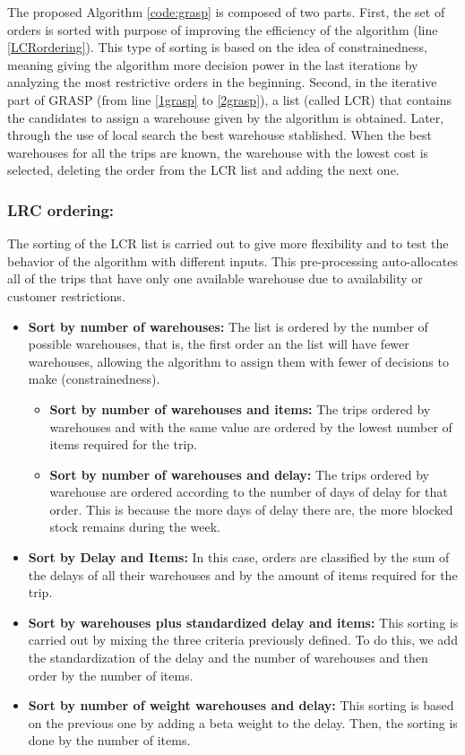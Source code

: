 \documentclass[letterpaper]{article} %
\begin{document}
The proposed Algorithm \ref{code:grasp} is composed of two parts. First, the set of orders is sorted with purpose of improving the efficiency of the algorithm (line \ref{LCRordering}). This type of sorting is based on the idea of constrainedness, meaning giving the algorithm more decision power in the last iterations by analyzing the most restrictive orders in the beginning. Second, in the iterative part of GRASP (from line \ref{1grasp} to \ref{2grasp}), a list (called LCR) that contains the candidates to assign a warehouse given by the algorithm is obtained. Later, through the use of local search the best warehouse stablished. When the best warehouses for all the trips are known, the warehouse with the lowest cost is selected, deleting the order from the LCR list and adding the next one.

\subsubsection*{LRC ordering:}
The sorting of the LCR list is carried out to give more flexibility and to test the behavior of the algorithm with different inputs. This pre-processing auto-allocates all of the trips that have only one available warehouse due to availability or customer restrictions.



\begin{itemize}
    \item \textbf{Sort by number of warehouses:} The list is ordered by the number of possible warehouses, that is, the first order an the list will have fewer warehouses, allowing the algorithm to assign them with fewer of decisions to make (constrainedness).
    \begin{itemize}
        \item \textbf{Sort by number of warehouses and items:} The trips ordered by warehouses and with the same value are ordered by the lowest number of items required for the trip.
        \item \textbf{Sort by number of warehouses and delay:} The trips ordered by warehouse are ordered according to the number of days of delay for that order. This is because the more days of delay there are, the more blocked stock remains during the week.
    \end{itemize}
    \item \textbf{Sort by Delay and Items:} In this case, orders are classified by the sum of the delays of all their warehouses and by the amount of items required for the trip.

    \item \textbf{Sort by warehouses plus standardized delay and items:} This sorting is carried out by mixing the three criteria previously defined. To do this, we add the standardization of the delay and the number of warehouses and then order by the number of items.
    \item \textbf{Sort by number of weight warehouses and delay:} This sorting is based on the previous one by adding a beta weight to the delay. Then, the sorting is done by the number of items.
\end{itemize}
\end{document}
